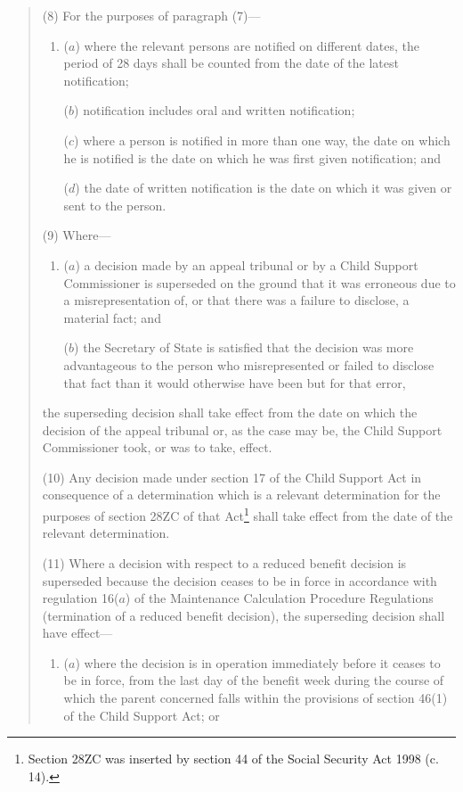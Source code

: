 \documentclass[12pt,a4paper]{article}
\begin{document}
\begin{quotation}
(8) For the purposes of paragraph (7)—
\begin{enumerate}\item[]
($a$) where the relevant persons are notified on different dates, the period of 28 days shall be counted from the date of the latest notification;

($b$) notification includes oral and written notification;

($c$) where a person is notified in more than one way, the date on which he is notified is the date on which he was first given notification; and

($d$) the date of written notification is the date on which it was given or sent to the person.
\end{enumerate}

(9) Where—
\begin{enumerate}\item[]
($a$) a decision made by an appeal tribunal or by a Child Support Commissioner is superseded on the ground that it was erroneous due to a misrepresentation of, or that there was a failure to disclose, a material fact; and

($b$) the Secretary of State is satisfied that the decision was more advantageous to the person who misrepresented or failed to disclose that fact than it would otherwise have been but for that error,
\end{enumerate}
the superseding decision shall take effect from the date on which the decision of the appeal tribunal or, as the case may be, the Child Support Commissioner took, or was to take, effect.

(10) Any decision made under section 17 of the Child Support Act in consequence of a determination which is a relevant determination for the purposes of section 28ZC of that Act\footnote{\frenchspacing Section 28ZC was inserted by section 44 of the Social Security Act 1998 (c. 14).} shall take effect from the date of the relevant determination.

(11) Where a decision with respect to a reduced benefit decision is superseded because the decision ceases to be in force in accordance with regulation 16($a$)  of the Maintenance Calculation Procedure Regulations (termination of a reduced benefit decision), the superseding decision shall have effect—
\begin{enumerate}\item[]
($a$) where the decision is in operation immediately before it ceases to be in force, from the last day of the benefit week during the course of which the parent concerned falls within the provisions of section 46(1) of the Child Support Act; or


\end{enumerate}
\end{quotation}
\end{document}
